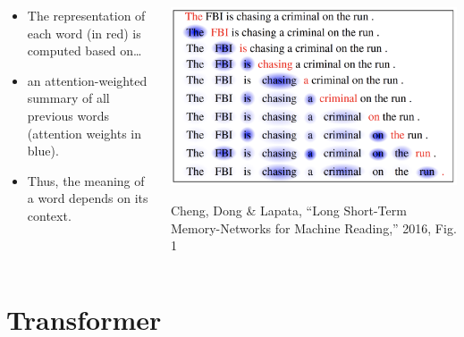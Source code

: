 \documentclass{beamer}
\begin{document}
\begin{frame}
  \begin{columns}
    \begin{column}{0.4\textwidth}
      \begin{itemize}
        \item 
          The representation of each word (in red) is
          computed based on\ldots
        \item
          an attention-weighted summary of all previous
          words (attention weights in blue).
        \item
          Thus, the meaning of a word depends on its context.
      \end{itemize}
    \end{column}
    \begin{column}{0.6\textwidth}
      \begin{center}
        \includegraphics[width=\textwidth]{figs/cheng2016fig1.png}

        \begin{tiny}
          Cheng, Dong \& Lapata, ``Long Short-Term Memory-Networks for
          Machine Reading,'' 2016, Fig. 1
        \end{tiny}
      \end{center}
    \end{column}
  \end{columns}
\end{frame}


\section{Transformer}
\setcounter{subsection}{1}
\end{document}
